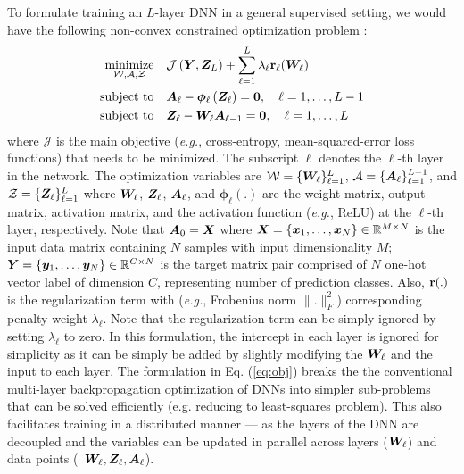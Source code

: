 To formulate training an $L$-layer DNN in a general supervised setting, we would have the following non-convex constrained optimization problem \cite{zeng2018global}:
\begin{align} \label{eq:obj}
	\operatorname*{\rm minimize}_{ \mathcal{W}, \mathcal{A}, \mathcal{Z}} \quad &\mathcal{J}\left({\bm{Y}}, {\bm{Z}}_{L} \right) + \sum_{\ell = 1}^{L} \lambda_{\ell}  {\bf r}_{\ell} ({\bm{W}}_{\ell}) \\
	 {\rm subject~to} \quad & {\bm{A}}_{\ell} - {\bm \phi}_{\ell } \left( {\bm{Z}}_{\ell} \right) = {\bf 0}, \quad \ell = 1,\dots, L-1   \nonumber \\
	 {\rm subject~to} \quad & {\bm{Z}}_{\ell} - {\bm{W}}_{\ell} {\bm{A}}_{\ell-1} = {\bf 0}, \quad \ell = 1, \dots , L \nonumber 
\end{align}
where $\mathcal{J}$ is the main objective (\textit{e.g.}, cross-entropy, mean-squared-error loss functions) that needs to be minimized. The subscript $\ell$ denotes the $\ell$-th layer in the network. The optimization variables are $\mathcal{W} = \{ {\bm{W}}_\ell\}_{\ell=1}^{L}$, $\mathcal{A} = \{ {\bm{A}}_{\ell}\}_{\ell=1}^{L-1}$, and $\mathcal{Z} = \{ {\bm{Z}}_{\ell}\}_{\ell=1}^{L}$ where ${\bm{W}}_\ell$, ${\bm{Z}}_{\ell}$, ${\bm{A}}_\ell$, and ${\bm \phi}_\ell (.)$ are the weight matrix, output matrix, activation matrix, and the activation function (\textit{e.g.}, ReLU) at the $\ell$-th layer, respectively. Note that ${\bm{A}}_{0} = {\bm{X}}$ where ${\bm{X}} = \{ {\bm{x}}_1,\dots, {\bm{x}}_N \} \in  \mathbb{R}^{M \times N}$ is the input data matrix containing $N$ samples with input dimensionality $M$; ${\bm{Y}} = \{{\bm{y}}_1,\dots, {\bm{y}}_N \} \in \mathbb{R}^{C \times N}$ is the target matrix pair comprised of $N$ one-hot vector label of dimension $C$, representing number of prediction classes. Also, ${\bf r(.)}$ is the regularization term with (\textit{e.g.}, Frobenius norm $\|.\|_F^2$) corresponding penalty weight $\lambda_{\ell}$. Note that the regularization term can be simply ignored by setting $\lambda_\ell$ to zero. In this formulation, the intercept in each layer is ignored for simplicity as it can be simply be added by slightly modifying the ${\bm{W}}_\ell$ and the input to each layer. The formulation in Eq. (\ref{eq:obj}) breaks the the conventional multi-layer backpropagation optimization of DNNs into simpler sub-problems that can be solved efficiently (e.g. reducing to least-squares problem). This also facilitates training in a distributed manner --- as the layers of the DNN are decoupled and the variables can be updated in parallel across layers (${\bm{W}}_\ell$) and data points (\ ${\bm{W}}_\ell, {\bm{Z}}_\ell, {\bm{A}}_\ell$).



